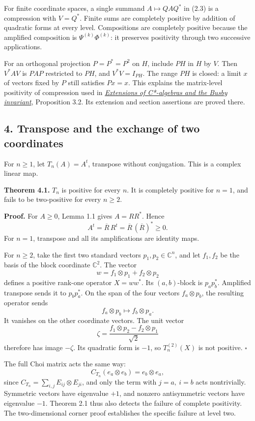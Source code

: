 \documentclass[
  11pt,
]{article}
\begin{document}
For finite coordinate spaces, a single summand \(A\mapsto QAQ^*\) in
(2.3) is a compression with \(V=Q^*\). Finite sums are completely
positive by addition of quadratic forms at every level. Compositions are
completely positive because the amplified composition is
\(\Psi^{(k)}\Phi^{(k)}\): it preserves positivity through two successive
applications.

For an orthogonal projection \(P=P^*=P^2\) on \(H\), include \(PH\) in
\(H\) by \(V\). Then \(V^*AV\) is \(PAP\) restricted to \(PH\), and
\(V^*V=I_{PH}\). The range \(PH\) is closed: a limit \(x\) of vectors
fixed by \(P\) still satisfies \(Px=x\). This explains the matrix-level
positivity of compression used in
\href{../KT-KK-01.html}{\emph{Extensions of C*-algebras and the Busby
invariant}}, Proposition 3.2. Its extension and section assertions are
proved there.

\subsection{4. Transpose and the exchange of two
coordinates}\label{transpose-and-the-exchange-of-two-coordinates}

For \(n\geq1\), let \(T_n(A)=A^t\), transpose without conjugation. This
is a complex linear map.

\textbf{Theorem 4.1.} \(T_n\) is positive for every \(n\). It is
completely positive for \(n=1\), and fails to be two-positive for every
\(n\geq2\).

\textbf{Proof.} For \(A\geq0\), Lemma 1.1 gives \(A=RR^*\). Hence \[
A^t=\overline R\,R^t
   =\overline R\,(\overline R)^*\geq0.
\tag{4.1}
\] For \(n=1\), transpose and all its amplifications are identity maps.

For \(n\geq2\), take the first two standard vectors
\(p_1,p_2\in\mathbb C^n\), and let \(f_1,f_2\) be the basis of the block
coordinate \(\mathbb C^2\). The vector \[
w=f_1\otimes p_1+f_2\otimes p_2
\] defines a positive rank-one operator \(X=ww^*\). Its \((a,b)\)-block
is \(p_ap_b^*\). Amplified transpose sends it to \(p_bp_a^*\). On the
span of the four vectors \(f_a\otimes p_b\), the resulting operator
sends \[
f_a\otimes p_b\longmapsto f_b\otimes p_a.
\] It vanishes on the other coordinate vectors. The unit vector \[
\zeta=\frac{f_1\otimes p_2-f_2\otimes p_1}{\sqrt2}
\] therefore has image \(-\zeta\). Its quadratic form is \(-1\), so
\(T_n^{(2)}(X)\) is not positive. \(\square\)

The full Choi matrix acts the same way: \[
C_{T_n}(e_a\otimes e_b)=e_b\otimes e_a,
\tag{4.2}
\] since \(C_{T_n}=\sum_{i,j}E_{ij}\otimes E_{ji}\), and only the term
with \(j=a,\ i=b\) acts nontrivially. Symmetric vectors have eigenvalue
\(+1\), and nonzero antisymmetric vectors have eigenvalue \(-1\).
Theorem 2.1 thus also detects the failure of complete positivity. The
two-dimensional corner proof establishes the specific failure at level
two.
\end{document}
